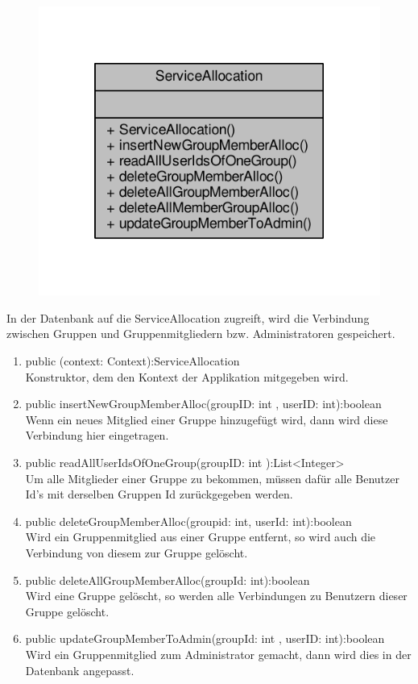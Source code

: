 \begin{figure}[H]
	\includegraphics[scale = 1]{res/umlClasses/service_allocation__coll__graph.pdf} 
	\centering
\end{figure}
In der Datenbank auf die ServiceAllocation zugreift, wird die Verbindung zwischen Gruppen und Gruppenmitgliedern bzw. Administratoren gespeichert. 
\begin{enumerate}
	\item public (context: Context):ServiceAllocation\\
		Konstruktor, dem den Kontext der Applikation mitgegeben wird.
	\item public insertNewGroupMemberAlloc(groupID: int , userID: int):boolean\\
		Wenn ein neues Mitglied einer Gruppe hinzugefügt wird, dann wird diese Verbindung hier eingetragen.
	\item public readAllUserIdsOfOneGroup(groupID: int ):List<Integer> \\
		Um alle Mitglieder einer Gruppe zu bekommen, müssen dafür alle Benutzer Id's mit derselben Gruppen Id zurückgegeben werden.
	\item public deleteGroupMemberAlloc(groupid: int, userId: int):boolean \\
		Wird ein Gruppenmitglied aus einer Gruppe entfernt, so wird auch die Verbindung von diesem zur Gruppe gelöscht.
	\item public deleteAllGroupMemberAlloc(groupId: int):boolean \\
		Wird eine Gruppe gelöscht, so werden alle Verbindungen zu Benutzern dieser Gruppe gelöscht.
	\item public updateGroupMemberToAdmin(groupId: int , userID: int):boolean \\
		Wird ein Gruppenmitglied zum Administrator gemacht, dann wird dies in der Datenbank angepasst.
\end{enumerate}
	

